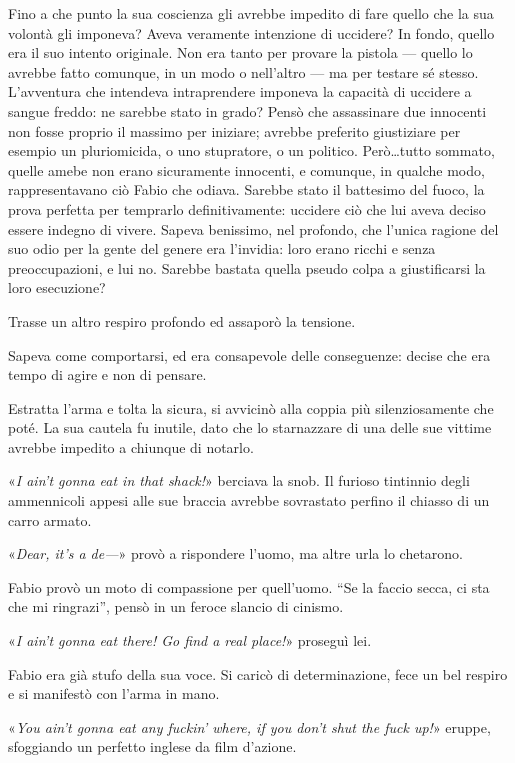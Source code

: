 Fino a che punto la sua coscienza gli avrebbe impedito di fare quello che la sua volontà gli imponeva? Aveva veramente intenzione di uccidere? In fondo, quello era il suo intento originale. Non era tanto per provare la pistola --- quello lo avrebbe fatto comunque, in un modo o nell'altro --- ma per testare sé stesso. L'avventura che intendeva intraprendere imponeva la capacità di uccidere a sangue freddo: ne sarebbe stato in grado? Pensò che assassinare due innocenti non fosse proprio il massimo per iniziare; avrebbe preferito giustiziare per esempio un pluriomicida, o uno stupratore, o un politico. Però\ldots \thinspace tutto sommato, quelle amebe non erano sicuramente innocenti, e comunque, in qualche modo, rappresentavano ciò Fabio che odiava. Sarebbe stato il battesimo del fuoco, la prova perfetta per temprarlo definitivamente: uccidere ciò che lui aveva deciso essere indegno di vivere. Sapeva benissimo, nel profondo, che l'unica ragione del suo odio per la gente del genere era l'invidia: loro erano ricchi e senza preoccupazioni, e lui no. Sarebbe bastata quella pseudo colpa a giustificarsi la loro esecuzione? 

Trasse un altro respiro profondo ed assaporò la tensione. 

Sapeva come comportarsi, ed era consapevole delle conseguenze: decise che era tempo di agire e non di pensare.

Estratta l'arma e tolta la sicura, si avvicinò alla coppia più silenziosamente che poté. La sua cautela fu inutile, dato che lo starnazzare di una delle sue vittime avrebbe impedito a chiunque di notarlo.

«\textit{I ain't gonna eat in that shack!}» berciava la snob. Il furioso tintinnio degli ammennicoli appesi alle sue braccia avrebbe sovrastato perfino il chiasso di un carro armato.

«\textit{Dear, it's a de---}» provò a rispondere l'uomo, ma altre urla lo chetarono.

Fabio provò un moto di compassione per quell'uomo. ``Se la faccio secca, ci sta che mi ringrazi'', pensò in un feroce slancio di cinismo.

«\textit{I ain't gonna eat there! Go find a real place!}» proseguì lei.

Fabio era già stufo della sua voce. Si caricò di determinazione, fece un bel respiro e si manifestò con l'arma in mano.

«\textit{You ain't gonna eat any fuckin' where, if you don't shut the fuck up!}» eruppe, sfoggiando un perfetto inglese da film d'azione.


